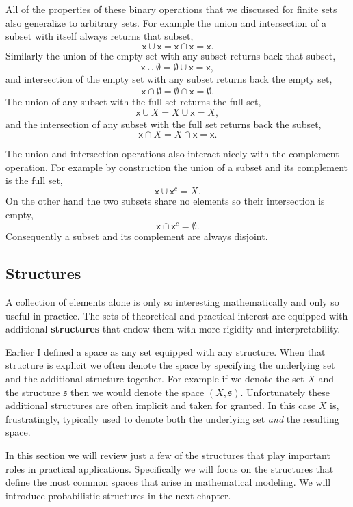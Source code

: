 \documentclass[
  letterpaper,
  DIV=11,
  numbers=noendperiod]{scrartcl}
\begin{document}
All of the properties of these binary operations that we discussed for
finite sets also generalize to arbitrary sets. For example the union and
intersection of a subset with itself always returns that subset, \[
\mathsf{x} \cup \mathsf{x} = \mathsf{x} \cap \mathsf{x} = \mathsf{x}.
\] Similarly the union of the empty set with any subset returns back
that subset, \[
\mathsf{x} \cup \emptyset = \emptyset \cup \mathsf{x} = \mathsf{x},
\] and intersection of the empty set with any subset returns back the
empty set, \[
\mathsf{x} \cap \emptyset = \emptyset \cap \mathsf{x} = \emptyset.
\] The union of any subset with the full set returns the full set, \[
\mathsf{x} \cup X = X \cup \mathsf{x} = X,
\] and the intersection of any subset with the full set returns back the
subset, \[
\mathsf{x} \cap X = X \cap \mathsf{x} = \mathsf{x}.
\]

The union and intersection operations also interact nicely with the
complement operation. For example by construction the union of a subset
and its complement is the full set, \[
\mathsf{x} \cup \mathsf{x}^{c} = X.
\] On the other hand the two subsets share no elements so their
intersection is empty, \[
\mathsf{x} \cap \mathsf{x}^{c} = \emptyset.
\] Consequently a subset and its complement are always disjoint.

\hypertarget{sec:structures}{%
\subsection{Structures}\label{sec:structures}}

A collection of elements alone is only so interesting mathematically and
only so useful in practice. The sets of theoretical and practical
interest are equipped with additional \textbf{structures} that endow
them with more rigidity and interpretability.

Earlier I defined a space as any set equipped with any structure. When
that structure is explicit we often denote the space by specifying the
underlying set and the additional structure together. For example if we
denote the set \(X\) and the structure \(\mathfrak{s}\) then we would
denote the space \((X, \mathfrak{s})\). Unfortunately these additional
structures are often implicit and taken for granted. In this case \(X\)
is, frustratingly, typically used to denote both the underlying set
\emph{and} the resulting space.

In this section we will review just a few of the structures that play
important roles in practical applications. Specifically we will focus on
the structures that define the most common spaces that arise in
mathematical modeling. We will introduce probabilistic structures in the
next chapter.
\end{document}
